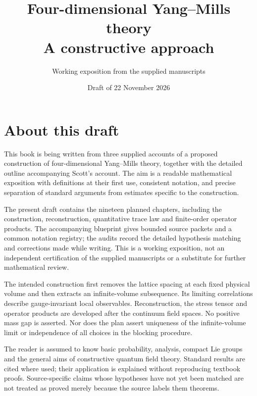 \documentclass[11pt,oneside,openany]{book}
\title{Four-dimensional Yang--Mills theory\\[6pt]
 \large A constructive approach}
\author{Working exposition from the supplied manuscripts}
\date{Draft of 22 November 2026}
\numberwithin{equation}{chapter}
\theoremstyle{definition}
\theoremstyle{remark}
\begin{document}
\frontmatter
\hypersetup{pageanchor=false}
\maketitle
\hypersetup{pageanchor=true}

\chapter*{About this draft}

This book is being written from three supplied accounts of a proposed
construction of four-dimensional Yang--Mills theory, together with the
detailed outline accompanying Scott's account. The aim is a readable
mathematical exposition with definitions at their first use, consistent
notation, and precise separation of standard arguments from estimates
specific to the construction.

The present draft contains the nineteen planned chapters, including the
construction, reconstruction, quantitative trace law and finite-order
operator products. The accompanying blueprint gives bounded source
packets and a common notation registry; the audits record the detailed
hypothesis matching and corrections made while writing. This is a
working exposition, not an independent certification of the supplied
manuscripts or a substitute for further mathematical review.

The intended construction first removes the lattice spacing at each fixed
physical volume and then extracts an infinite-volume subsequence. Its
limiting correlations describe gauge-invariant local observables.
Reconstruction, the stress tensor and operator products are developed
after the continuum field spaces. No positive mass gap is asserted. Nor does the plan assert
uniqueness of the infinite-volume limit or independence of all choices
in the blocking procedure.

The reader is assumed to know basic probability, analysis, compact Lie
groups and the general aims of constructive quantum field theory.
Standard results are cited where used; their application is explained
without reproducing textbook proofs. Source-specific claims whose
hypotheses have not yet been matched are not treated as proved merely
because the source labels them theorems.
\end{document}
